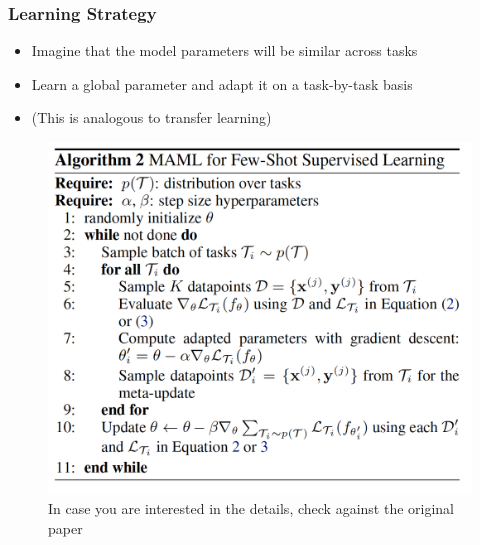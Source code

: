 \documentclass[10pt,mathserif]{beamer}
\begin{document}
\begin{frame}
  \frametitle{Learning Strategy}
 \begin{itemize}
 \item Imagine that the model parameters will be similar across tasks
 \item Learn a global parameter and adapt it on a task-by-task basis
 \item (This is analogous to transfer learning)
 \end{itemize}
\begin{figure}[ht]
  \centering
  \includegraphics[width=0.5\paperwidth]{figure/maml_paper}
  \caption{In case you are interested in the details, check against the original
    paper
    \label{fig:maml_paper} }
\end{figure}
\end{frame}
\end{document}
